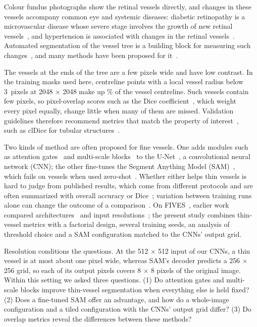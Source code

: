 Colour fundus photographs show the retinal vessels directly, and changes in these vessels accompany common eye and systemic
diseases: diabetic retinopathy is a microvascular disease whose severe stage involves the growth of new retinal
vessels~\cite{wong2016dr}, and hypertension is associated with changes in the retinal vessels~\cite{wong2004hypertensive}.
Automated segmentation of the vessel tree is a building block for measuring such changes~\cite{abramoff2010retinal}, and
many methods have been proposed for it~\cite{fraz2012survey}.

The vessels at the ends of the tree are a few pixels wide and have low contrast. In the training masks used here,
centreline points with a local vessel radius below 3~pixels at 2048 $\times$ 2048 make up \ShareThin\% of the vessel
centreline. Such vessels contain few pixels, so pixel-overlap scores such as the Dice coefficient~\cite{dice1945}, which
weight every pixel equally, change little when many of them are missed. Validation guidelines therefore recommend metrics
that match the property of interest~\cite{maierhein2024metrics,reinke2024pitfalls}, such as clDice for tubular
structures~\cite{shit2021cldice}.

Two kinds of method are often proposed for fine vessels. One adds modules such as attention
gates~\cite{oktay2018attention} and multi-scale blocks~\cite{yu2016dilated,liu2022msunet,cao2023mfaunet} to the
U-Net~\cite{ronneberger2015unet}, a convolutional neural network (CNN); the other fine-tunes the Segment Anything Model
(SAM)~\cite{kirillov2023sam}, which fails on vessels when used zero-shot~\cite{shi2023samzeroshot,qiu2023learnable}. Whether either helps thin vessels is hard to judge from published
results, which come from different protocols and are often summarized with overall accuracy or
Dice~\cite{liu2022msunet,cao2023mfaunet}; variation between training runs alone can change the outcome of a
comparison~\cite{bouthillier2021variance}. On FIVES~\cite{jin2022fives}, earlier work compared
architectures~\cite{fadugba2024benchmark} and input resolutions~\cite{amarnath2026resolution}; the present study
combines thin-vessel metrics with a factorial design, several training seeds, an analysis of threshold choice and a
SAM configuration matched to the CNNs' output grid.

Resolution conditions the questions. At the 512 $\times$ 512 input of our CNNs, a thin vessel is at most about one pixel
wide, whereas SAM's decoder predicts a 256 $\times$ 256 grid, so each of its output pixels covers 8 $\times$ 8 pixels of the
original image. Within this setting we asked three questions. (1) Do attention gates and multi-scale blocks improve
thin-vessel segmentation when everything else is held fixed? (2) Does a fine-tuned SAM offer an advantage, and how do a
whole-image configuration and a tiled configuration with the CNNs' output grid differ? (3) Do overlap metrics reveal the
differences between these methods?

